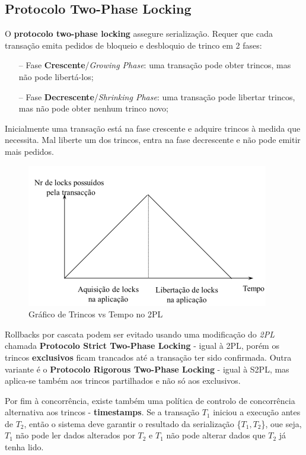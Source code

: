\documentclass[oneside]{book}
\theoremstyle{definition}
\begin{document}
\subsection{Protocolo Two-Phase Locking}
O \textbf{protocolo two-phase locking} assegure serialização. Requer que cada transação emita pedidos de bloqueio e desbloquio de trinco em 2 fases:
\begin{itemize}
    \itemsep 0cm
    \item[--] Fase \textbf{Crescente}/\textit{Growing Phase}: uma transação pode obter trincos, mas não pode libertá-los;
    \item[--] Fase \textbf{Decrescente}/\textit{Shrinking Phase}: uma transação pode libertar trincos, mas não pode obter nenhum trinco novo;
\end{itemize}
Inicialmente uma transação está na fase crescente e adquire trincos à medida que necessita. Mal liberte um dos trincos, entra na fase decrescente e não pode emitir mais pedidos.

\begin{figure}[H]
    \centering
    \includegraphics[scale=0.4]{cap_transct/trincos_tempo_2pl.png}
    \caption{Gráfico de Trincos vs Tempo no 2PL}
\end{figure}

Rollbacks por cascata podem ser evitado usando uma modificação do \textit{2PL} chamada \textbf{Protocolo Strict Two-Phase Locking} - igual à 2PL, porém os trincos \textbf{exclusivos} ficam trancados até a transação ter sido confirmada. Outra variante é o \textbf{Protocolo Rigorous Two-Phase Locking} - igual à S2PL, mas aplica-se também aos trincos partilhados e não só aos exclusivos.

Por fim à concorrência, existe também uma política de controlo de concorrência alternativa aos trincos - \textbf{timestamps}. Se a transação $T_1$ iniciou a execução antes de $T_2$, então o sistema deve garantir o resultado da serialização \{$T_1, T_2$\}, oue seja, $T_1$ não pode ler dados alterados por $T_2$ e $T_1$ não pode alterar dados que $T_2$ já tenha lido.
\end{document}
